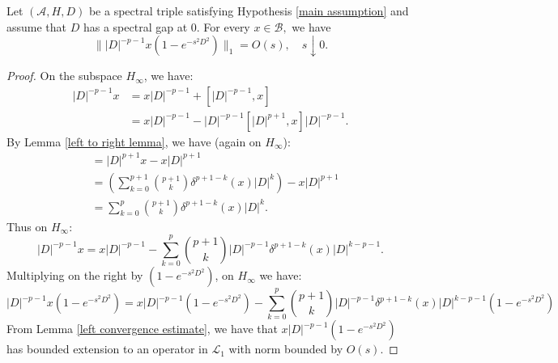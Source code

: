     \begin{lem}\label{right convergence estimate}
        Let $(\mathcal{A},H,D)$ be a spectral triple satisfying Hypothesis \ref{main assumption} and assume that $D$ has a spectral gap at $0.$ For every $x\in\mathcal{B},$ we have
        \begin{equation*}
            \||D|^{-p-1}x(1-e^{-s^2D^2})\|_1 = O(s),\quad s\downarrow0.
        \end{equation*}
    \end{lem}
    \begin{proof}
        On the subspace $H_\infty$, we have:
        \begin{align*}
            |D|^{-p-1}x &= x|D|^{-p-1}+[|D|^{-p-1},x]\\
                        &= x|D|^{-p-1}-|D|^{-p-1}[|D|^{p+1},x]|D|^{-p-1}.
        \end{align*}
        By Lemma \ref{left to right lemma}, we have (again on $H_\infty$):
        \begin{align*}
            [|D|^{p+1},x] &= |D|^{p+1}x-x|D|^{p+1}\\
                          &= \left(\sum_{k=0}^{p+1}\binom{p+1}{k}\delta^{p+1-k}(x)|D|^k\right)-x|D|^{p+1}\\
                          &= \sum_{k=0}^p\binom{p+1}{k}\delta^{p+1-k}(x)|D|^k.
        \end{align*}
        Thus on $H_\infty$:
        \begin{equation*}
            |D|^{-p-1}x = x|D|^{-p-1}-\sum_{k=0}^p\binom{p+1}{k}|D|^{-p-1}\delta^{p+1-k}(x)|D|^{k-p-1}.
        \end{equation*}
        Multiplying on the right by $(1-e^{-s^2D^2})$, on $H_\infty$ we have:
        \begin{equation}\label{left to right expansion in trace class}
            |D|^{-p-1}x(1-e^{-s^2D^2}) = x|D|^{-p-1}(1-e^{-s^2D^2})-\sum_{k=0}^p \binom{p+1}{k}|D|^{-p-1}\delta^{p+1-k}(x)|D|^{k-p-1}(1-e^{-s^2D^2})
        \end{equation}
        From Lemma \ref{left convergence estimate}, we have that $x|D|^{-p-1}(1-e^{-s^2D^2})$ has bounded extension to an operator in $\mathcal{L}_1$ with norm bounded by $O(s)$.


\end{proof}
